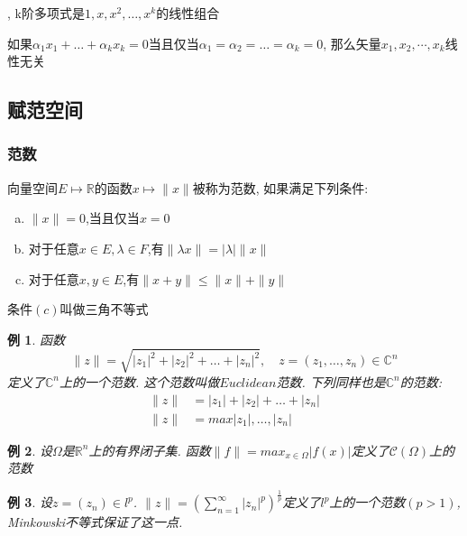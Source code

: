 \documentclass[a4paper,11pt]{article}
\theoremstyle{mystyle}
\newtheorem{example}{\hspace{2em}例}[section]
\begin{document}
, k阶多项式是$1,x,x^2,\dots,x^k$的线性组合

\begin{definition}[线性无关]
  如果$\alpha_1x_1+\dots+\alpha_kx_k=0$当且仅当$\alpha_1=\alpha_2=\dots=\alpha_k=0$, 那么矢量${x_1,x_2,\cdots,x_k}$线性无关
\end{definition}
\subsection{赋范空间}
\subsubsection*{范数}
\begin{definition}[范数]
  向量空间$E\mapsto\mathbb{R}$的函数$x\mapsto\|x\|$被称为范数, 如果满足下列条件:
  \begin{enumerate}[(a)]
    \item $\|x\|=0$,当且仅当$x=0$
    \item 对于任意$x\in E,\lambda\in F$,有$\|\lambda x\|=|\lambda|\|x\|$
    \item 对于任意$x,y\in E$,有$\|x+y\|\leq\|x\|+\|y\|$
  \end{enumerate}
\end{definition}
条件$(c)$叫做三角不等式
\begin{example}
  函数
  \begin{equation*}
    \|z\|=\sqrt{|z_1|^2+|z_2|^2+\dots+|z_n|^2},\quad z=(z_1,\dots,z_n)\in\mathbb{C}^n
  \end{equation*}
  定义了$\mathbb{C}^n$上的一个范数. 这个范数叫做$Euclidean$范数. 下列同样也是$\mathbb{C}^n$的范数:
  \begin{equation*}
    \begin{split}
       \|z\| & =|z_1|+|z_2|+\dots+|z_n| \\
       \|z\| & =max{|z_1|,\dots,|z_n|}
    \end{split}
  \end{equation*}
\end{example}
\begin{example}\label{norm1}
  设$\Omega$是$\mathbb{R}^n$上的有界闭子集. 函数$\|f\|=max_{x\in\Omega}|f(x)|$定义了$\mathcal{C}(\Omega)$上的范数
\end{example}
\begin{example}\label{norm2}
  设$z=(z_n)\in l^p$. $\|z\|=(\sum_{n=1}^{\infty}|z_n|^p)^\frac{1}{p}$定义了$l^p$上的一个范数$(p>1)$, Minkowski不等式保证了这一点.
\end{example}
\end{document}
